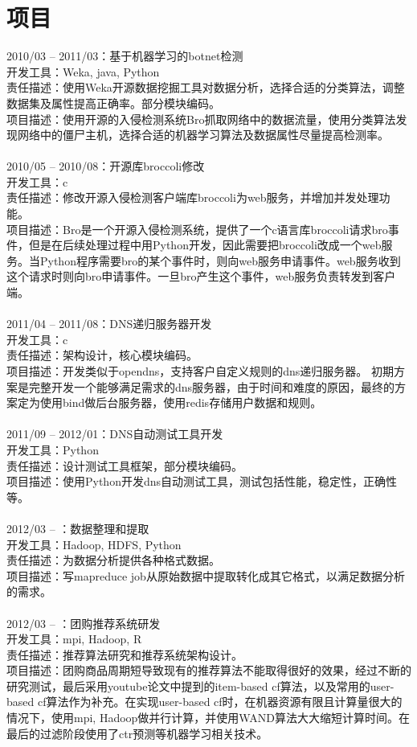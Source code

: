 \documentclass[11pt, a4paper]{article}
\begin{document}
\section*{项目}

2010/03 -- 2011/03：基于机器学习的botnet检测 \\
开发工具：Weka, java, Python \\
责任描述：使用Weka开源数据挖掘工具对数据分析，选择合适的分类算法，调整数据集及属性提高正确率。部分模块编码。 \\
项目描述：使用开源的入侵检测系统Bro抓取网络中的数据流量，使用分类算法发现网络中的僵尸主机，选择合适的机器学习算法及数据属性尽量提高检测率。 \\
\\
2010/05 -- 2010/08：开源库broccoli修改 \\
开发工具：c \\
责任描述：修改开源入侵检测客户端库broccoli为web服务，并增加并发处理功能。 \\
项目描述：Bro是一个开源入侵检测系统，提供了一个c语言库broccoli请求bro事件，但是在后续处理过程中用Python开发，因此需要把broccoli改成一个web服务。当Python程序需要bro的某个事件时，则向web服务申请事件。web服务收到这个请求时则向bro申请事件。一旦bro产生这个事件，web服务负责转发到客户端。 \\
\\
2011/04 -- 2011/08：DNS递归服务器开发 \\
开发工具：c \\
责任描述：架构设计，核心模块编码。 \\
项目描述：开发类似于opendns，支持客户自定义规则的dns递归服务器。 初期方案是完整开发一个能够满足需求的dns服务器，由于时间和难度的原因，最终的方案定为使用bind做后台服务器，使用redis存储用户数据和规则。 \\
\\
2011/09 -- 2012/01：DNS自动测试工具开发 \\
开发工具：Python \\
责任描述：设计测试工具框架，部分模块编码。 \\
项目描述：使用Python开发dns自动测试工具，测试包括性能，稳定性，正确性等。 \\
\\
2012/03 -- ：数据整理和提取 \\
开发工具：Hadoop, HDFS, Python \\
责任描述：为数据分析提供各种格式数据。 \\
项目描述：写mapreduce job从原始数据中提取转化成其它格式，以满足数据分析的需求。 \\
\\
2012/03 -- ：团购推荐系统研发 \\
开发工具：mpi, Hadoop, R \\
责任描述：推荐算法研究和推荐系统架构设计。 \\
项目描述：团购商品周期短导致现有的推荐算法不能取得很好的效果，经过不断的研究测试，最后采用youtube论文中提到的item-based cf算法，以及常用的user-based cf算法作为补充。在实现user-based cf时，在机器资源有限且计算量很大的情况下，使用mpi, Hadoop做并行计算，并使用WAND算法大大缩短计算时间。在最后的过滤阶段使用了ctr预测等机器学习相关技术。 \\
\end{document}
